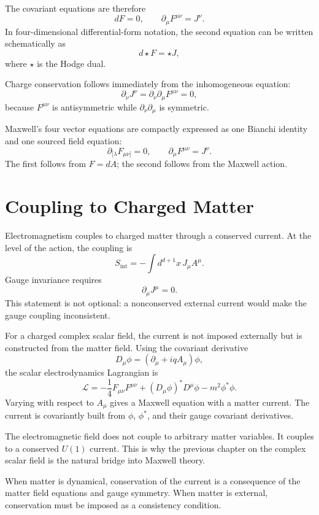 The covariant equations are therefore
\[
    dF=0,
    \qquad
    \partial_\mu F^{\mu\nu}=J^\nu.
\]
In four-dimensional differential-form notation, the second equation can be
written schematically as
\[
    d\star F=\star J,
\]
where \(\star\) is the Hodge dual.

Charge conservation follows immediately from the inhomogeneous equation:
\[
    \partial_\nu J^\nu=\partial_\nu\partial_\mu F^{\mu\nu}=0,
\]
because \(F^{\mu\nu}\) is antisymmetric while \(\partial_\nu\partial_\mu\) is
symmetric.

\begin{summarybox}
Maxwell's four vector equations are compactly expressed as one Bianchi identity
and one sourced field equation:
\[
    \partial_{[\lambda}F_{\mu\nu]}=0,
    \qquad
    \partial_\mu F^{\mu\nu}=J^\nu.
\]
The first follows from \(F=dA\); the second follows from the Maxwell action.
\end{summarybox}

\section{Coupling to Charged Matter}

Electromagnetism couples to charged matter through a conserved current. At the
level of the action, the coupling is
\[
    S_{\mathrm{int}}=-\int d^{d+1}x\,J_\mu A^\mu.
\]
Gauge invariance requires
\[
    \partial_\mu J^\mu=0.
\]
This statement is not optional: a nonconserved external current would make the
gauge coupling inconsistent.

For a charged complex scalar field, the current is not imposed externally but is
constructed from the matter field. Using the covariant derivative
\[
    D_\mu\phi=(\partial_\mu+iqA_\mu)\phi,
\]
the scalar electrodynamics Lagrangian is
\[
    \mathcal{L}
    =-\frac{1}{4}F_{\mu\nu}F^{\mu\nu}
     +(D_\mu\phi)^*D^\mu\phi-m^2\phi^*\phi.
\]
Varying with respect to \(A_\mu\) gives a Maxwell equation with a matter current.
The current is covariantly built from \(\phi\), \(\phi^*\), and their gauge
covariant derivatives.

\begin{remarkbox}
The electromagnetic field does not couple to arbitrary matter variables. It
couples to a conserved \(U(1)\) current. This is why the previous chapter on the
complex scalar field is the natural bridge into Maxwell theory.
\end{remarkbox}

When matter is dynamical, conservation of the current is a consequence of the
matter field equations and gauge symmetry. When matter is external, conservation
must be imposed as a consistency condition.

